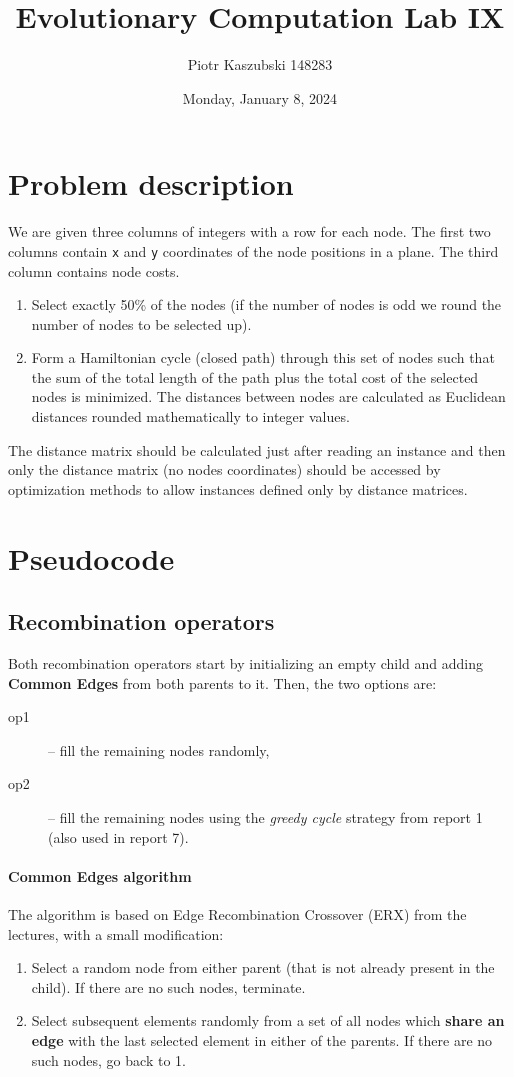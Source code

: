 \documentclass[14pt]{article}
\title{Evolutionary Computation Lab IX}
\author{Piotr Kaszubski 148283}
\date{Monday, January  8, 2024}
\begin{document}
\maketitle
\tableofcontents
\newpage

\section{Problem description}
We are given three columns of integers with a row for each node. The first two
columns contain \verb`x` and \verb`y` coordinates of the node positions in a
plane. The third column contains node costs.

\begin{enumerate}
	\item Select exactly 50\% of the nodes (if the number of nodes is odd we
		round the number of nodes to be selected up).
	\item Form a Hamiltonian cycle (closed path) through this set of nodes such
		that the sum of the total length of the path plus the total cost of the
		selected nodes is minimized. The distances between nodes are calculated
		as Euclidean distances rounded mathematically to integer values.
\end{enumerate}

The distance matrix should be calculated just after reading an instance and
then only the distance matrix (no nodes coordinates) should be accessed by
optimization methods to allow instances defined only by distance matrices.

\section{Pseudocode}
\subsection{Recombination operators}
Both recombination operators start by initializing an empty child and adding
\textbf{Common Edges} from both parents to it. Then, the two options are:
\begin{description}
	\item [op1] -- fill the remaining nodes randomly,
	\item [op2] -- fill the remaining nodes using the \emph{greedy cycle}
		strategy from report 1 (also used in report 7).
\end{description}

\paragraph{Common Edges algorithm} The algorithm is based on Edge Recombination
Crossover (ERX) from the lectures, with a small modification:
\begin{enumerate}
	\item Select a random node from either parent (that is not already present
		in the child). If there are no such nodes, terminate.
	\item Select subsequent elements randomly from a set of all nodes which
		\textbf{share an edge} with the last selected element in either of the
		parents. If there are no such nodes, go back to 1.
\end{enumerate}
\end{document}
